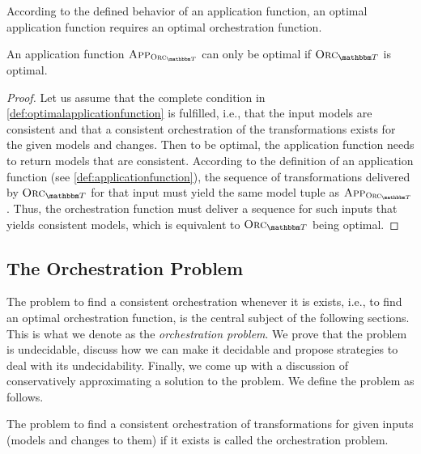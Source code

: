 According to the defined behavior of an application function, an optimal application function requires an optimal orchestration function.

\begin{lemma}
    \label{lemma:optimalapplicationfunction}
    An application function $\appfunction{\orcfunction{\transformationset{T}}}$ can only be optimal if $\orcfunction{\transformationset{T}}$ is optimal.
\end{lemma}
\begin{proof}
    Let us assume that the complete condition in \autoref{def:optimalapplicationfunction} is fulfilled, i.e., that the input models are consistent and that a consistent orchestration of the transformations exists for the given models and changes.
    Then to be optimal, the application function needs to return models that are consistent.
    According to the definition of an application function (see \autoref{def:applicationfunction}), the sequence of transformations delivered by $\orcfunction{\transformationset{T}}$ for that input must yield the same model tuple as $\appfunction{\orcfunction{\transformationset{T}}}$.
    Thus, the orchestration function must deliver a sequence for such inputs that yields consistent models, which is equivalent to $\orcfunction{\transformationset{T}}$ being optimal.
\end{proof}


\subsection{The Orchestration Problem}

The problem to find a consistent orchestration whenever it is exists, i.e., to find an optimal orchestration function, is the central subject of the following sections.
This is what we denote as the \emph{orchestration problem}.
We prove that the problem is undecidable, discuss how we can make it decidable and propose strategies to deal with its undecidability.
Finally, we come up with a discussion of conservatively approximating a solution to the problem.
We define the problem as follows.
\begin{definition}
    \label{def:orchestrationproblem}
    The problem to find a consistent orchestration of transformations for given inputs (models and changes to them) if it exists is called the orchestration problem.
\end{definition}

